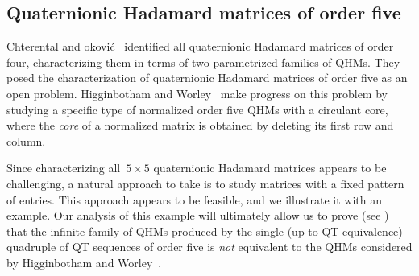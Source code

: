 \documentclass[12pt]{article}
\numberwithin{equation}{section}
\begin{document}
\subsection{Quaternionic Hadamard matrices of order five}
\label{sec-characterization}

Chterental and {\DJ}okovi{\'c}~\cite{CD08-stochastic-matrices} identified all quaternionic Hadamard matrices of order four, characterizing them in terms of two parametrized families of QHMs.
They posed the characterization of quaternionic Hadamard matrices of order five as an open problem.
Higginbotham and Worley~\cite{HW22-qhm} make progress on this problem by studying a specific type of normalized order five QHMs with a circulant core,
where the \emph{core} of a normalized matrix is obtained by deleting its first row and column.

Since characterizing all~$5 \times 5$ quaternionic Hadamard matrices appears to be challenging, a natural approach to take is to study matrices with a fixed pattern of entries.
This approach appears to be feasible, and we illustrate it with an example.
Our analysis of this example will ultimately allow us to prove (see )
that the infinite family of QHMs produced by the single (up to QT equivalence) quadruple of QT sequences of order five
is \emph{not} equivalent to the QHMs considered by Higginbotham and Worley~\cite{HW22-qhm}.
\end{document}
